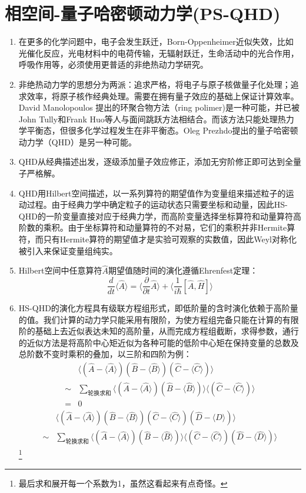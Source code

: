 \documentclass[12pt,a4paper,openany,twoside]{book}
\numberwithin{equation}{section}
\newcommand{\mean}[1]{\langle #1 \rangle}
\begin{document}
      \chapter{相空间-量子哈密顿动力学(PS-QHD)}
      \begin{enumerate}
  \item 在更多的化学问题中，电子会发生跃迁，Born-Oppenheimer近似失效，比如光催化反应，光电材料中的电荷传输，无辐射跃迁，生命活动中的光合作用，呼吸作用等，必须使用更普适的非绝热动力学研究。

  \item 非绝热动力学的思想分为两派：追求严格，将电子与原子核做量子化处理；追求效率，将原子核作经典处理。需要在拥有量子效应的基础上保证计算效率。David Manolopoulos 提出的环聚合物方法（ring polimer)是一种可能，并已被John Tully和Frank Huo等人与面间跳跃方法相结合。而该方法只能处理热力学平衡态，但很多化学过程发生在非平衡态。Oleg Prezhdo提出的量子哈密顿动力学（QHD）是另一种可能。

  \item QHD从经典描述出发，逐级添加量子效应修正，添加无穷阶修正即可达到全量子严格解。

  \item QHD用Hilbert空间描述，以一系列算符的期望值作为变量组来描述粒子的运动过程。由于经典力学中确定粒子的运动状态只需要坐标和动量，因此HS-QHD的一阶变量直接对应于经典力学，而高阶变量选择坐标算符和动量算符高阶数的乘积。由于坐标算符和动量算符的不对易，它们的乘积并非Hermite算符，而只有Hermite算符的期望值才是实验可观察的实数值，因此Weyl对称化被引入来保证变量组纯实。

  \item Hilbert空间中任意算符$\hat{A}$期望值随时间的演化遵循Ehrenfest定理：
  \begin{equation}
  \frac{d}{dt}\mean{\hat{A}}=\mean{\frac{\partial}{\partial t} \hat{A}}+\mean{\frac{1}{i\hbar}\left[\hat{A},\hat{H}\right]}
  \end{equation}

  \item HS-QHD的演化方程具有级联方程组形式，即低阶量的含时演化依赖于高阶量的值。我们计算的动力学只能采用有限阶，为使方程组完备只能在计算的有限阶的基础上去近似表达未知的高阶量，从而完成方程组截断，求得参数，通行的近似方法是将高阶中心矩近似为各种可能的低阶中心矩在保持变量的总数及总阶数不变时乘积的叠加，以三阶和四阶为例：
  \begin{align*}
  &\mean{(\hat{A}-\mean{\hat{A}})(\hat{B}-\mean{\hat{B}})(\hat{C}-\mean{\hat{C}})}\\
  \sim & \sum_{\text{轮换求和}}\mean{(\hat{A}-\mean{\hat{A}})(\hat{B}-\mean{\hat{B}})}\mean{(\hat{C}-\mean{\hat{C}})}\\
  =& 0
  \end{align*}
  \begin{align*}
  &\mean{(\hat{A}-\mean{\hat{A}})(\hat{B}-\mean{\hat{B}})(\hat{C}-\mean{\hat{C}})(\hat{D}-\mean{\hat{D}})}\\
  \sim & \sum_{\text{轮换求和}}\mean{(\hat{A}-\mean{\hat{A}})(\hat{B}-\mean{\hat{B}})}\mean{(\hat{C}-\mean{\hat{C}})(\hat{D}-\mean{\hat{D}})}
  \end{align*}\footnote{最后求和展开每一个系数为1，虽然这看起来有点奇怪。}


\end{enumerate}
\end{document}
